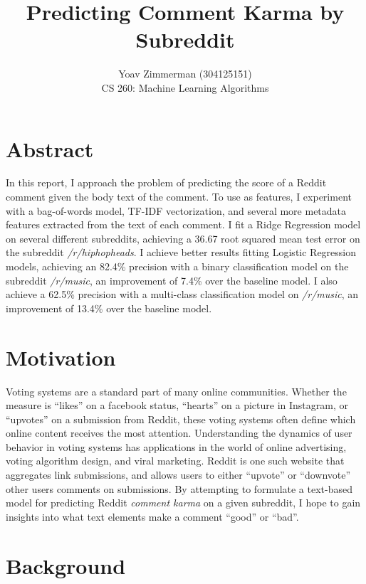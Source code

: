 \documentclass[11pt, twocolumn]{article}
\begin{document}
\title{Predicting Comment Karma by Subreddit}
\author{Yoav Zimmerman (304125151) \\
	    CS 260: Machine Learning Algorithms \\}
\maketitle

\section{Abstract}

In this report, I approach the problem of predicting the score of a Reddit comment given the body text of the comment. To use as features, I experiment with a bag-of-words model, TF-IDF vectorization, and several more metadata features extracted from the text of each comment. I fit a Ridge Regression model on several different subreddits, achieving a 36.67 root squared mean test error on the subreddit \textit{/r/hiphopheads}. I achieve better results fitting Logistic Regression models, achieving an 82.4\% precision with a binary classification model on the subreddit \textit{/r/music}, an improvement of 7.4\% over the baseline model. I also achieve a 62.5\% precision with a multi-class classification model on \textit{/r/music}, an improvement of 13.4\% over the baseline model.

\section{Motivation}

Voting systems are a standard part of many online communities. Whether the measure is ``likes'' on a facebook status, “hearts” on a picture in Instagram, or “upvotes” on a submission from Reddit, these voting systems often define which online content receives the most attention. Understanding the dynamics of user behavior in voting systems has applications in the world of online advertising, voting algorithm design, and viral marketing. Reddit is one such website that aggregates link submissions, and allows users to either “upvote” or “downvote” other users comments on submissions. By attempting to formulate a text-based model for predicting Reddit \textit{comment karma} on a given subreddit, I hope to gain insights into what text elements make a comment ``good'' or ``bad''.

\section{Background}
\end{document}
